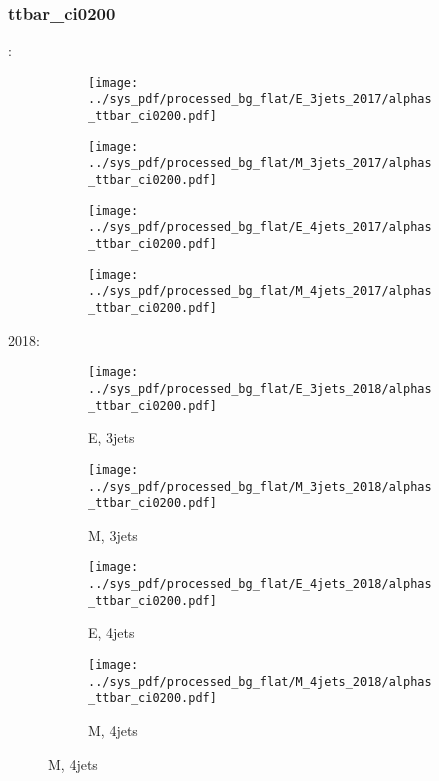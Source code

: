 \documentclass{beamer}
\begin{document}
\begin{frame}
\frametitle{ttbar_ci0200}
\fontsize{5}{1}:
\begin{figure}
\centering
\begin{subfigure}[b]{0.24\textwidth}
\texttt{[image: ../sys\_pdf/processed\_bg\_flat/E\_3jets\_2017/alphas\_ttbar\_ci0200.pdf]}
\end{subfigure}
\begin{subfigure}[b]{0.24\textwidth}
\texttt{[image: ../sys\_pdf/processed\_bg\_flat/M\_3jets\_2017/alphas\_ttbar\_ci0200.pdf]}
\end{subfigure}
\begin{subfigure}[b]{0.24\textwidth}
\texttt{[image: ../sys\_pdf/processed\_bg\_flat/E\_4jets\_2017/alphas\_ttbar\_ci0200.pdf]}
\end{subfigure}
\begin{subfigure}[b]{0.24\textwidth}
\texttt{[image: ../sys\_pdf/processed\_bg\_flat/M\_4jets\_2017/alphas\_ttbar\_ci0200.pdf]}
\end{subfigure}
\end{figure}
2018:
\begin{figure}
\centering
\begin{subfigure}[b]{0.24\textwidth}
\texttt{[image: ../sys\_pdf/processed\_bg\_flat/E\_3jets\_2018/alphas\_ttbar\_ci0200.pdf]}
\captionsetup{font=tiny}
\caption{E, 3jets}
\end{subfigure}
\begin{subfigure}[b]{0.24\textwidth}
\texttt{[image: ../sys\_pdf/processed\_bg\_flat/M\_3jets\_2018/alphas\_ttbar\_ci0200.pdf]}
\captionsetup{font=tiny}
\caption{M, 3jets}
\end{subfigure}
\begin{subfigure}[b]{0.24\textwidth}
\texttt{[image: ../sys\_pdf/processed\_bg\_flat/E\_4jets\_2018/alphas\_ttbar\_ci0200.pdf]}
\captionsetup{font=tiny}
\caption{E, 4jets}
\end{subfigure}
\begin{subfigure}[b]{0.24\textwidth}
\texttt{[image: ../sys\_pdf/processed\_bg\_flat/M\_4jets\_2018/alphas\_ttbar\_ci0200.pdf]}
\captionsetup{font=tiny}
\caption{M, 4jets}
\end{subfigure}
\end{figure}
\end{frame}
\end{document}
